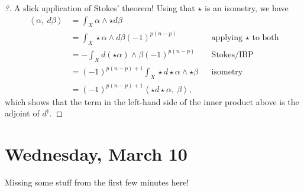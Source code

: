 \begin{proof}[?]

A slick application of Stokes' theorem! Using that \(\star\) is an
isometry, we have
\begin{align*}
{\left\langle { \alpha},~{ d \beta} \right\rangle} 
&= \int_X \alpha\wedge \star d \beta \\
&= \int_X \star\alpha \wedge d \beta 
(-1)^{p(n-p)} 
&& \text{applying $\star$ to both} \\
&= -\int_X d( \star\alpha) \wedge \beta (-1)^{p(n-p)}
&& \text{Stokes/IBP} \\
&= (-1)^{p(n-p)+1} \int_X \star d \star\alpha \wedge \star\beta 
&& \text{isometry}\\
&= (-1)^{p(n-p)+1} {\left\langle {\star d \star\alpha},~{ \beta} \right\rangle}
,\end{align*}
which shows that the term in the left-hand side of the inner product
above is the adjoint of \(d^\dagger\).

\end{proof}

\hypertarget{wednesday-march-10}{%
\section{Wednesday, March 10}\label{wednesday-march-10}}

\begin{warnings}

Missing some stuff from the first few minutes here!

\end{warnings}

